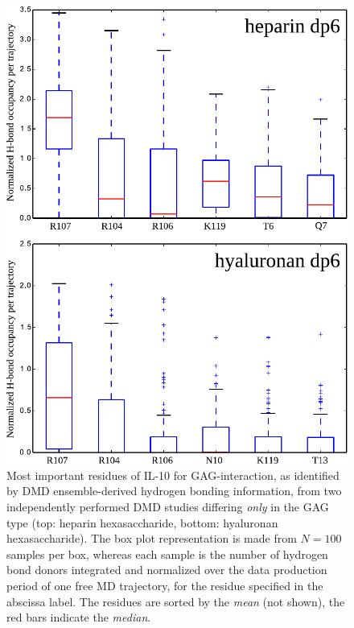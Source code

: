 \begin{figure}
\centering
\includegraphics[width=1.0\textwidth]{gfx/dmdil10/round1_il10_hbond_hadp6_vs_hpdp6.pdf}
\caption[]{Most important residues of IL-10 for GAG-interaction, as identified
by DMD ensemble-derived hydrogen bonding information, from two independently
performed DMD studies differing \textit{only} in the GAG type (top: heparin
hexasaccharide, bottom: hyaluronan hexasaccharide). The box plot representation
is made from  $N=100$ samples per box, whereas each sample is the number of
hydrogen bond donors integrated and normalized over the data production period
of one free MD trajectory, for the residue specified in the abscissa label.
The residues are sorted by the \textit{mean} (not shown), the red bars indicate
the \textit{median}.}
\label{fig:dmdil10:hp_hexa_vs_ha_hexa_hbond}
\end{figure}


